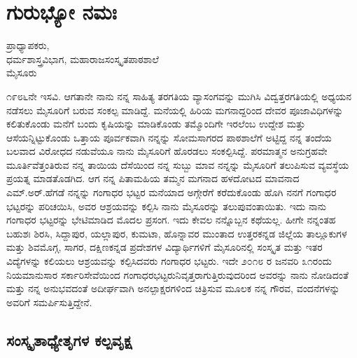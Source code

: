 {\fontsize{14}{16}\selectfont
\chapter{ಗುರುಭ್ಯೋ ನಮಃ}

\begin{center}
\smallskip

ಪ್ರಾಧ್ಯಾಪಕರು,\\ 
ಧರ್ಮಶಾಸ್ತ್ರವಿಭಾಗ, ಮಹಾರಾಜಸಂಸ್ಕೃತಪಾಠಶಾಲೆ\\ 
ಮೈಸೂರು
\addrule
\end{center}

೧೯೮೬ನೇ ಇಸವಿ. ಆಗತಾನೇ ನಾನು ನನ್ನ ಸಾಹಿತ್ಯ ತರಗತಿಯ ವ್ಯಾಸಂಗವನ್ನು ಮುಗಿಸಿ ವಿದ್ವತ್ತರಗತಿಯಲ್ಲಿ ಅಧ್ಯಯನ ನಡೆಸಲು ಮೈಸೂರಿಗೆ ಬರುವ ಸಂಕಲ್ಪ ಮಾಡಿದ್ದೆ. ಮನೆಯಲ್ಲಿ ಹಿರಿಯ ಮಗನಾದ್ದರಿಂದ ದೇವರ ಪೂಜಾವಿಧಿಗಳನ್ನು ಕಲಿತು\-ಕೊಂಡು ಮನೆಗೆ ಬಂದು ಕೃಷಿಯನ್ನು ಮಾಡಿಕೊಂಡು ತಮ್ಮೊಂದಿಗೇ ಇರಲೆಂಬ ಉದ್ದೇಶ ಮತ್ತು ಆಸೆಯನ್ನಿಟ್ಟುಕೊಂಡು ಒತ್ತಾಯ ಪೂರ್ವಕವಾಗಿ ನನ್ನನ್ನು ಸೋಮಸಾಗರದ ಪಾಠಶಾಲೆಗೆ ಅಟ್ಟಿದ್ದ ನನ್ನ ತಂದೆಯ ಬಲವಾದ ವಿರೋಧದ ನಡುವೆಯೂ ನಾನು ಮೈಸೂರಿಗೆ ಹೊರಡಲು ಸಂಕಲ್ಪಿಸಿದ್ದೆ. ಪರಮಾತ್ಮನ ಅನುಗ್ರಹವೇ ಮೂರ್ತಿವೆತ್ತಂತಿರುವ ನನ್ನ ತಾಯಿಯ ದೆಸೆಯಿಂದ ನನ್ನ ಸುಬ್ಬು ಮಾವ ನನ್ನನ್ನು ಮೈಸೂರಿಗೆ ತಲುಪಿಸುವ ವ್ಯವಸ್ಥೆಯ ಪ್ರಯತ್ನ ಮಾಡತೊಡಗಿದ. ಆಗ ನನ್ನ ಪಿತಾಮಹಿಯ ತಮ್ಮನ ಮಗನಾದ ಹಳದೋಟದ ಮಾವನಾದ ಎಮ್.ಅರ್.ಹೆಗಡೆ ನನ್ನನ್ನು ಗಂಗಾಧರ ಭಟ್ಟರ ಮನೆಯಾದ ಅಗ್ಗೇರೆಗೆ ಕರೆದುಕೊಂಡು ಹೊಗಿ ನನಗೆ ಗಂಗಾಧರ ಭಟ್ಟರನ್ನು ಪರಿಚಯಿಸಿ, ಅವರ ಆಶ್ರಯವನ್ನು ಕಲ್ಪಿಸಿ ನಾನು ಮೈಸೂರನ್ನು ತಲುಪುವಂತಾಯಿತು. ಇದು ನಾನು ಗಂಗಾಧರ ಭಟ್ಟರನ್ನು ಭೇಟಿಮಾಡಿದ ಮೊದಲ ಪ್ರಸಂಗ. ಇದು ಕೇವಲ ನನ್ನೊಬ್ಬನ ಕಥೆಯಲ್ಲ. ಹೀಗೇ ನನ್ನಂತಹ ಬಹುಶಃ ಶಿರಸಿ, ಸಿದ್ದಾಪುರ, ಯಲ್ಲಾಪುರ, ಕುಮಟಾ, ಹೊನ್ನಾವರ ಮುಂತಾದ ಉತ್ತರಕನ್ನಡ ಜಿಲ್ಲೆಯ ತಾಲ್ಲೂಕುಗಳ ಮತ್ತು ಶಿವಮೊಗ್ಗ, ಸಾಗರ, ದಕ್ಷಿಣ\-ಕನ್ನಡ ಪ್ರದೇಶಗಳ ವಿದ್ಯಾರ್ಥಿಗಳಿಗೆ ಮೈಸೂರಿನಲ್ಲಿ ಸಂಸ್ಕೃತ ಮತ್ತು ಇತರ ವಿದ್ಯೆಗಳನ್ನು ಕಲಿಯಲು ಆಶ್ರಯವನ್ನು ಕಲ್ಪಿಸಿದವರು ಗಂಗಾಧರ ಭಟ್ಟರು. ಇದೇ ೨೦೧೮ ರ ಜನವರಿ ೩೧ರಂದು ನಿಯಮಾನುಸಾರ ಸರ್ಕಾರಿಸೇವೆಯಿಂದ ಗಂಗಾಧರಭಟ್ಟರು\break ನಿವೃತ್ತರಾಗುತ್ತಿರುವುದರಿಂದ ಅವರನ್ನು ನಾನು ನೋಡಿದಂತೆ ಮತ್ತು ನನ್ನ ಅನುಭವದಂತೆ ಅದೀರ್ಘವಾಗಿ ಅನಲ್ಪಾಕ್ಷರಗಳಿಂದ ಚಿತ್ರಿಸುವ ಮೂಲಕ ನನ್ನ ಗೌರವ, ವಂದನೆ\-ಗಳನ್ನು ಅವರಿಗೆ ಸಮರ್ಪಿಸುತ್ತಿದ್ದೇನೆ.

\section*{ಸಂಸ್ಕೃತಾಧ್ಯೇತೃಗಳ ಕಲ್ಪವೃಕ್ಷ}

}
